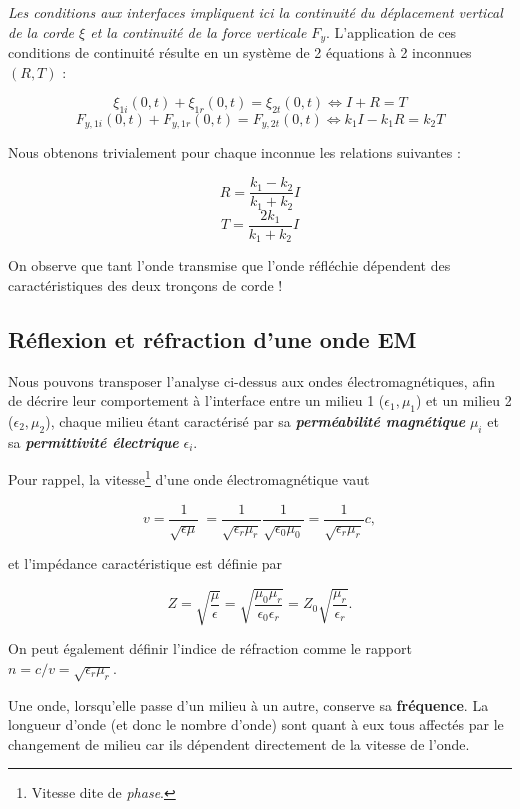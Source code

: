 \textit{Les conditions aux interfaces impliquent ici la continuité du déplacement vertical de la corde $\xi$ et la continuité de la force 
verticale $F_y$}.  L'application de ces conditions de continuité résulte en un système de 2 équations à 2 inconnues $(R,T)$ :

\[\xi_{1i}(0,t) + \xi_{1r}(0,t) = \xi_{2t}(0,t) \Leftrightarrow I + R = T\]
\[F_{y,1i}(0,t) + F_{y,1r}(0,t) = F_{y,2t}(0,t) \Leftrightarrow k_{1}I - k_{1}R = k_{2}T\]

Nous obtenons trivialement pour chaque inconnue les relations suivantes : 

\[R = \frac{k_{1} - k_{2}}{k_{1} + k_{2}}I\]
\[T = \frac{2 k_{1}}{k_{1} + k_{2}}I\]

On observe que tant l'onde transmise que l'onde réfléchie dépendent des caractéristiques des deux tronçons de corde !


\subsection{Réflexion et réfraction d'une onde EM} 

Nous pouvons transposer l'analyse ci-dessus aux ondes électromagnétiques, afin de décrire leur comportement à l'interface entre un milieu 1 ($\epsilon_{1}, \mu_{1}$) et un milieu 2 ($\epsilon_{2},\mu_{2}$), chaque milieu étant caractérisé par sa \textit{\textbf{perméabilité magnétique}} $\mu_i$
et sa \textbf{\textit{permittivité électrique}} $\epsilon_i$.

Pour rappel, la vitesse\footnote{Vitesse dite de \textit{phase}.} d'une onde électromagnétique vaut  

\[v = \frac{1}{\sqrt{\epsilon \mu}}\ = \frac{1}{\sqrt{\epsilon_{r} \mu_{r}}} \frac{1}{\sqrt{\epsilon_{0} \mu_{0}}} = \frac{1}{\sqrt{\epsilon_{r} \mu_{r}}} c,  \] 

et l'impédance caractéristique est définie par 

\[Z = \sqrt{\frac{\mu}{\epsilon}} = \sqrt{\frac{\mu_0\mu_r}{\epsilon_0\epsilon_r}} = Z_0 \sqrt{\frac{\mu_r}{\epsilon_r}}.  \]

On peut également définir l'indice de réfraction comme le rapport $n = c/v = \sqrt{\epsilon_{r}\mu_r}$.

Une onde, lorsqu'elle passe d'un milieu à un autre, conserve sa \textbf{fréquence}. La longueur d'onde (et donc le nombre d'onde) sont quant à eux tous affectés 
par le changement de milieu car ils dépendent directement de la vitesse de l'onde.


